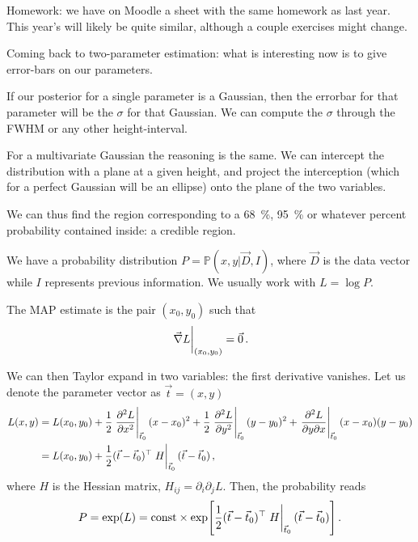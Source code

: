 \documentclass[main.tex]{subfiles}
\begin{document}

Homework: we have on Moodle a sheet with the same homework as last year.
This year's will likely be quite similar, although a couple exercises might change.

Coming back to two-parameter estimation:
what is interesting now is to give error-bars on our parameters. 

If our posterior for a single parameter is a Gaussian, then the errorbar for that parameter will be the \(\sigma \) for that Gaussian.
We can compute the \(\sigma \) through the FWHM or any other height-interval. 

For a multivariate Gaussian the reasoning is the same. 
We can intercept the distribution with a plane at a given height, and project the interception (which for a perfect Gaussian will be an ellipse) onto the plane of the two variables. 

We can thus find the region corresponding to a \SI{68}{\percent}, \SI{95}{\percent} or whatever percent probability contained inside: a credible region.

We have a probability distribution \(P = \mathbb{P}(x, y | \vec{D}, I)\), where \(\vec{D}\) is the data vector while \(I\) represents previous information. 
We usually work with \(L = \log P\).

The MAP estimate is the pair \((x_0 , y_0 )\) such that 
%
\begin{align}
\eval{\vec{\nabla} L}_{(x_0 , y_0 )} = \vec{0}
\,.
\end{align}

We can then Taylor expand in two variables: the first derivative vanishes. Let us denote the parameter vector as \(\vec{t} = (x, y)\)
%
\begin{align}
L(x, y) &= L(x_0 , y_0 ) 
+ \frac{1}{2} \eval{\pdv[2]{L}{x}}_{\vec{t}_0} (x - x_0)^2
+ \frac{1}{2} \eval{\pdv[2]{L}{y}}_{\vec{t}_0} (y - y_0)^2
+ \eval{\pdv{L}{y}{x}}_{\vec{t}_0} (x-x_0 )(y - y_0)  \\
&= L(x_0 , y_0 ) 
+ \frac{1}{2} (\vec{t} - \vec{t}_0)^{\top} \eval{H}_{\vec{t}_0 } (\vec{t} - \vec{t}_0)
\,,
\end{align}
%
where \(H\) is the Hessian matrix, \(H_{ij} = \partial_{i} \partial_{j} L\). 
Then, the probability reads 
%
\begin{align}
P = \exp(L) = \const \times  \exp[ \frac{1}{2} (\vec{t} - \vec{t}_0)^{\top} \eval{H}_{\vec{t}_0 } (\vec{t} - \vec{t}_0)]
\,.
\end{align}
\end{document}

